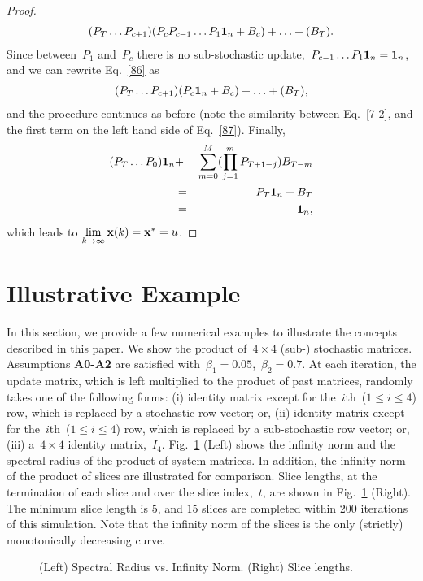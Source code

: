 \documentclass[draftclsnofoot, onecolumn, 12pt]{IEEEtran}
\begin{document}
\begin{proof}
\begin{eqnarray}
(P_{T}\ldots P_{{c}+1})(P_{c} P_{{c}-1}\ldots P_{{1}}
{\bf{1}}_n+B_{{c}})+\ldots+(B_{T}).\label{86}
\end{eqnarray}
Since between~$P_1$ and~$P_c$ there is no sub-stochastic update,~$P_{{c}-1}\ldots P_{{1}}
{\bf{1}}_n={\bf{1}}_n$, and we can rewrite Eq.~\eqref{86} as
\begin{eqnarray}
(P_{T}\ldots P_{{c}+1})(P_{c}
{\bf{1}}_n+B_{{c}})+\ldots+(B_{T}),\label{87}
\end{eqnarray}
and the procedure continues as before (note the similarity between Eq.~\eqref{7-2}, and the first term on the left hand side of Eq.~\eqref{87}). Finally, 
\begin{eqnarray}
( P_{T} \ldots P_{{0}}){\bf{1}}_n&+&
\sum\limits_{m=0}^{M}(\prod_{j=1}^m P_{T+1-j})B_{T-m}\nonumber\\
&=&P_{{T}}{\bf{1}}_n+B_{T}\nonumber\\
&=&{\bf{1}}_n,
\end{eqnarray}
which leads to $\lim\limits_{k \rightarrow \infty}{\bf{x}}(k)= {\bf{x}}^{*}={{u}}$.
\end{proof}

\section{Illustrative Example}\label{example}
In this section, we provide a few numerical examples to illustrate the concepts described in this paper. We show the product of~$4 \times 4$ (sub-) stochastic matrices. Assumptions {\bf{A0-A2}} are satisfied with~$\beta_1=0.05$,~$\beta_2=0.7$. At each iteration, the update matrix, which is left multiplied to the product of past matrices, randomly takes one of the following forms: 
(i) identity matrix except for the~$i$th~($1\leq i \leq4$) row, which is replaced by a stochastic row vector; or,
(ii) identity matrix except for the~$i$th~($1\leq i \leq4$) row, which is replaced by a sub-stochastic row vector; or, 
(iii) a~$4 \times 4$ identity matrix,~$I_4$. 
Fig.~\ref{f2} (Left) shows the infinity norm and the spectral radius of the product of system matrices. In addition, the infinity norm of the product of slices are illustrated for comparison. Slice lengths, at the termination of each slice and over the slice index,~$t$, are shown in Fig.~\ref{f2} (Right). The minimum slice length is $5$, and $15$ slices are completed within $200$ iterations of this simulation. Note that the infinity norm of the slices is the only (strictly) monotonically decreasing curve. 
\begin{figure}[!h]
\centering
{}
\caption{(Left) Spectral Radius vs. Infinity Norm. (Right) Slice lengths.}
\label{f2}
\end{figure}
\end{document}
